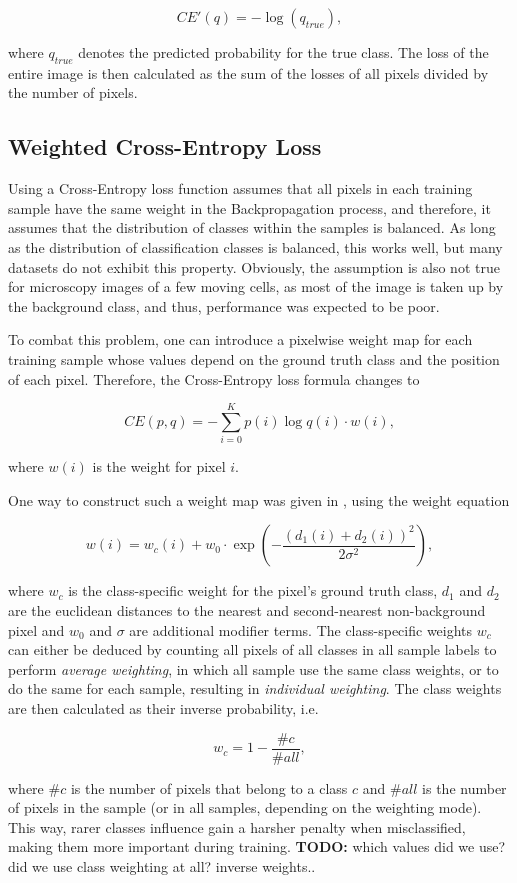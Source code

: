 \[CE'(q) = - \log(q_{true}),\]

\noindent where $q_{true}$ denotes the predicted probability for the true class. The loss of the entire image is then calculated as the sum of the losses of all pixels divided by the number of pixels.


		\subsection{Weighted Cross-Entropy Loss}

Using a Cross-Entropy loss function assumes that all pixels in each training sample have the same weight in the Backpropagation process, and therefore, it assumes that the distribution of classes within the samples is balanced. As long as the distribution of classification classes is balanced, this works well, but many datasets do not exhibit this property. Obviously, the assumption is also not true for microscopy images of a few moving cells, as most of the image is taken up by the background class, and thus, performance was expected to be poor.

To combat this problem, one can introduce a pixelwise weight map for each training sample whose values depend on the ground truth class and the position of each pixel. Therefore, the Cross-Entropy loss formula changes to

\[CE(p, q) = -\sum \limits_{i = 0}^{K} p(i) \log q(i) \cdot w(i),\]

\noindent where $w(i)$ is the weight for pixel $i$.

One way to construct such a weight map was given in \cite{unet}, using the weight equation

\[ w(i) = w_c(i) + w_0 \cdot \exp \left (- \frac{(d_1(i) + d_2(i))^2}{2\sigma^2} \right ), \]

\noindent where $w_c$ is the class-specific weight for the pixel's ground truth class, $d_1$ and $d_2$ are the euclidean distances to the nearest and second-nearest non-background pixel and $w_0$ and $\sigma$ are additional modifier terms. The class-specific weights $w_c$ can either be deduced by counting all pixels of all classes in all sample labels to perform \textit{average weighting}, in which all sample use the same class weights, or to do the same for each sample, resulting in \textit{individual weighting}. The class weights are then calculated as their inverse probability, i.e.

\[ w_c = 1 - \frac{\#c}{\#all}, \]

\noindent where $\#c$ is the number of pixels that belong to a class $c$ and $\#all$ is the number of pixels in the sample (or in all samples, depending on the weighting mode). This way, rarer classes influence gain a harsher penalty when misclassified, making them more important during training.  \textbf{TODO:} which values did we use? did we use class weighting at all? inverse weights..


